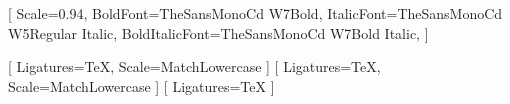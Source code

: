 \setmonofont{TheSansMonoCd W5Regular}[
    Scale=0.94,
    BoldFont=TheSansMonoCd W7Bold,
    ItalicFont=TheSansMonoCd W5Regular Italic,
    BoldItalicFont=TheSansMonoCd W7Bold Italic,
]

[
    Ligatures=TeX,
    Scale=MatchLowercase
]
\setmathfontface{}[
    Ligatures=TeX,
    Scale=MatchLowercase
]
\setoperatorfont\mathoper
\newfontface{}[
    Ligatures=TeX
]
